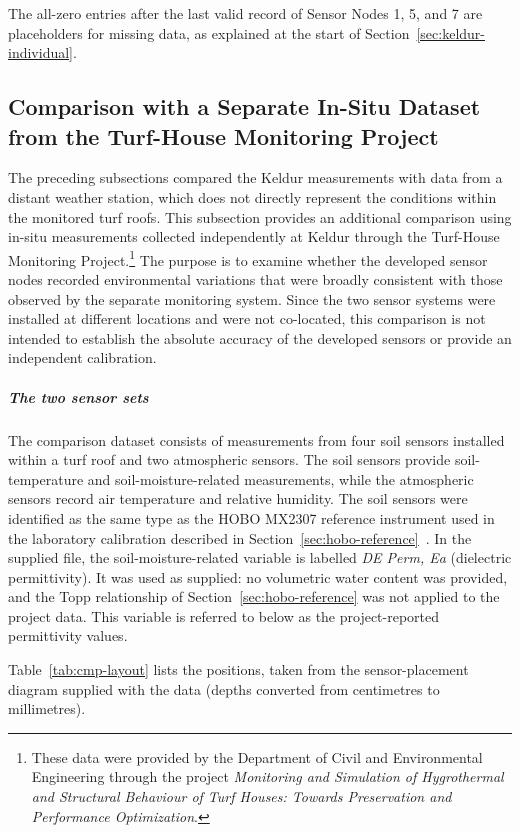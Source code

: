The all-zero entries after the last valid record of Sensor Nodes 1, 5, and 7 are placeholders for missing data, as explained at the start of Section~\ref{sec:keldur-individual}.

\subsection{Comparison with a Separate In-Situ Dataset from the Turf-House Monitoring Project}\label{sec:keldur-comparison}

The preceding subsections compared the Keldur measurements with data from a distant weather station, which does not directly represent the conditions within the monitored turf roofs. This subsection provides an additional comparison using in-situ measurements collected independently at Keldur through the Turf-House Monitoring Project.\footnote{These data were provided by the Department of Civil and Environmental Engineering through the project \textit{Monitoring and Simulation of Hygrothermal and Structural Behaviour of Turf Houses: Towards Preservation and Performance Optimization}.} The purpose is to examine whether the developed sensor nodes recorded environmental variations that were broadly consistent with those observed by the separate monitoring system. Since the two sensor systems were installed at different locations and were not co-located, this comparison is not intended to establish the absolute accuracy of the developed sensors or provide an independent calibration.

\subparagraph{The two sensor sets}

The comparison dataset consists of measurements from four soil sensors installed within a turf roof and two atmospheric sensors. The soil sensors provide soil-temperature and soil-moisture-related measurements, while the atmospheric sensors record air temperature and relative humidity. The soil sensors were identified as the same type as the HOBO MX2307 reference instrument used in the laboratory calibration described in Section~\ref{sec:hobo-reference}~\cite{onset_mx2307}. In the supplied file, the soil-moisture-related variable is labelled \textit{DE Perm, Ea} (dielectric permittivity). It was used as supplied: no volumetric water content was provided, and the Topp relationship of Section~\ref{sec:hobo-reference} was not applied to the project data. This variable is referred to below as the project-reported permittivity values.

Table~\ref{tab:cmp-layout} lists the positions, taken from the sensor-placement diagram supplied with the data (depths converted from centimetres to millimetres).

